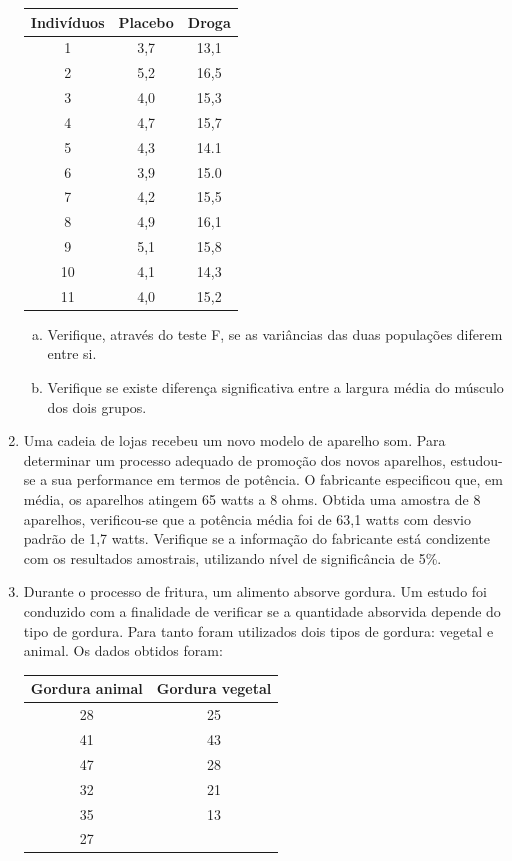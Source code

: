 \documentclass[12pt, a4paper]{article}
\begin{document}
\begin{enumerate}
\begin{center}
\begin{tabular}{|c|c|c|}
\hline
\textbf{Indivíduos} & \textbf{Placebo} & \textbf{Droga} \\
\hline
1 & 3,7 & 13,1 \\
2 & 5,2 & 16,5 \\
3 & 4,0 & 15,3 \\
4 & 4,7 & 15,7 \\
5 & 4,3 & 14.1 \\
6 & 3,9 & 15.0 \\
7 & 4,2 & 15,5 \\
8 & 4,9 & 16,1 \\
9 & 5,1 & 15,8 \\
10 & 4,1 & 14,3 \\
11 & 4,0 & 15,2 \\
\hline
\end{tabular}
\end{center}

\begin{enumerate}[a)]
    \item Verifique, através do teste F, se as variâncias das duas populações diferem entre si.
    \item Verifique se existe diferença significativa entre a largura média do músculo dos dois grupos.
\end{enumerate}

\item Uma cadeia de lojas recebeu um novo modelo de aparelho som. Para determinar um processo adequado de promoção dos novos aparelhos, estudou-se a sua performance em termos de potência. O fabricante especificou que, em média, os aparelhos atingem 65 watts a 8 ohms. Obtida uma amostra de 8 aparelhos, verificou-se que a potência média foi de 63,1 watts com desvio padrão de 1,7 watts. Verifique se a informação do fabricante está condizente com os resultados amostrais, utilizando nível de significância de 5\%.

\item Durante o processo de fritura, um alimento absorve gordura. Um estudo foi conduzido com a finalidade de verificar se a quantidade absorvida depende do tipo de gordura. Para tanto foram utilizados dois tipos de gordura: vegetal e animal. Os dados obtidos foram:

\begin{center}
\begin{tabular}{|c|c|}
\hline
\textbf{Gordura animal} & \textbf{Gordura vegetal} \\
\hline
28 & 25 \\
41 & 43 \\
47 & 28 \\
32 & 21 \\
35 & 13 \\
27 & \\
\hline
\end{tabular}
\end{center}


\end{enumerate}
\end{document}

